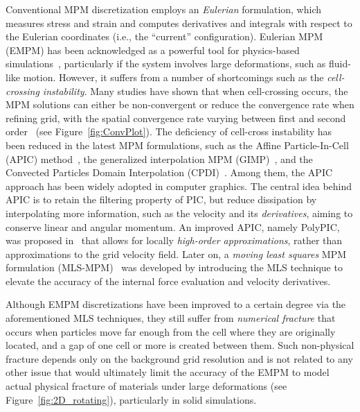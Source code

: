 Conventional MPM discretization employs an \emph{Eulerian} formulation, which measures stress and strain and computes derivatives and integrals with respect to the Eulerian coordinates (i.e., the ``current'' configuration). 
Eulerian MPM (EMPM) has been acknowledged as a powerful tool for physics-based simulations~\cite{jiang2016material}, particularly if the system involves large deformations, such as fluid-like motion. 
However, it suffers from a number of shortcomings such as the \emph{cell-crossing instability}. 
Many studies have shown that when cell-crossing occurs, the MPM solutions can either be non-convergent or reduce the convergence rate when refining grid, with the spatial convergence rate varying between first and second order~\cite{W:2007:improved} (see Figure~\ref{fig:ConvPlot}).
The deficiency of cell-cross instability has been reduced in the latest MPM formulations, such as the Affine Particle-In-Cell (APIC) method~\cite{Jiang:2017:APIC}, the generalized interpolation MPM (GIMP)~\cite{Bardenhagen:2004:GIMPM, Gao:2017:AGIMPM}, and the Convected Particles Domain Interpolation (CPDI)~\cite{Sadeghirad:2011:CPDI}. 
Among them, the APIC approach has been widely adopted in computer graphics. The central idea behind APIC is to retain the filtering property of PIC, but reduce dissipation by interpolating more information, such as the velocity and its \emph{derivatives}, aiming to conserve linear and angular momentum. 
An improved APIC, namely PolyPIC, was proposed in~\cite{Fu:2017:PolyPIC} that allows for locally \emph{high-order approximations}, rather than approximations to the grid velocity field.
Later on, a \emph{moving least squares} MPM formulation (MLS-MPM)~\cite{Hu:2018:Moving} was developed by introducing the MLS technique to elevate the accuracy of the internal force evaluation and velocity derivatives. 
 
 Although EMPM discretizations have been improved to a certain degree via the aforementioned MLS techniques, they still suffer from \emph{numerical fracture} that occurs when particles move far enough from the cell where they are originally located, and a gap of one cell or more is created between them. 
 Such non-physical fracture depends only on the background grid resolution and is not related to any other issue that would ultimately limit the accuracy of the EMPM to model actual physical fracture of materials under large deformations (see Figure~\ref{fig:2D_rotating}), particularly in solid simulations.
 
